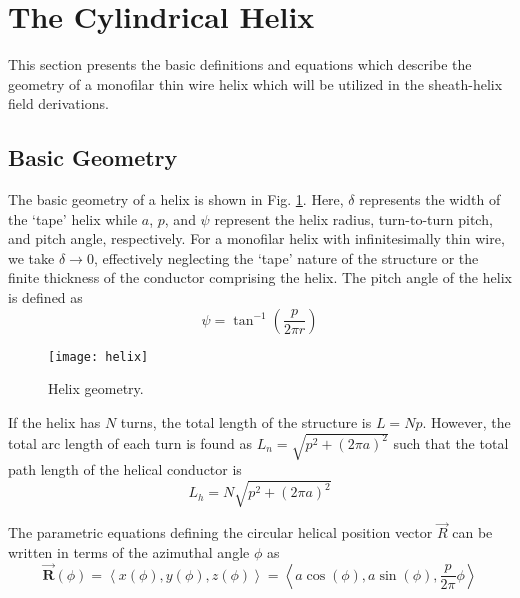 \section{The Cylindrical Helix}\label{sec:geometry}
This section presents the basic definitions and equations which describe the geometry of a monofilar thin wire helix which will be utilized in the sheath-helix field derivations. 
\subsection{Basic Geometry}\label{subsec:basicGeometry}
The basic geometry of a helix is shown in Fig. \ref{fig:helix}. Here, $\delta$ represents the width of the `tape' helix while $a$, $p$, and $\psi$ represent the helix radius, turn-to-turn pitch, and pitch angle, respectively. For a monofilar helix with infinitesimally thin wire, we take $\delta\rightarrow0$, effectively neglecting the `tape' nature of the structure or the finite thickness of the conductor comprising the helix. The pitch angle of the helix is defined as
\begin{equation}\label{eq:pitchAngle}
	\psi = \tan^{-1}\left(\frac{p}{2\pi r}\right)
\end{equation}

\begin{figure}[b]
	\centering
	\texttt{[image: helix]}
	\caption{Helix geometry.}
	\label{fig:helix}
\end{figure}
If the helix has $N$ turns, the total length of the structure is $L=Np$. However, the total arc length of each turn is found as $L_n = \sqrt{p^2 + (2\pi a)^2}$ such that the total path length of the helical conductor is 
\begin{equation}
	L_h = N\sqrt{p^2 + (2\pi a)^2}
\end{equation}

The parametric equations defining the circular helical position vector $\vec{R}$ can be written in terms of the azimuthal angle $\phi$ as 
\begin{equation}\label{eq:parametric}
	\vec{\mathbf{R}}(\phi) = \left\langle x(\phi), y(\phi), z(\phi) \right\rangle = \left\langle a\cos(\phi), a\sin(\phi), \frac{p}{2\pi}\phi \right\rangle
\end{equation}

